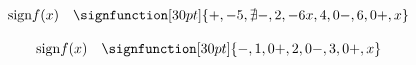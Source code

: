 \documentclass{article}
\begin{document}
\[
\text{sign}f(x) \quad 
    \signfunction[30pt]{
        { + , -5 , \nexists }
        { - , 2 , -6 }
        { x , 4 , 0 }
        { - , 6 , 0 }
        { + , x }
    }
\]

\[
    \text{sign}f(x) \quad 
    \signfunction[30pt]{
        { - , 1 , 0 }
        { + , 2 , 0 }
        { - , 3 , 0 }
        { + , x }
    }
\]
\end{document}
